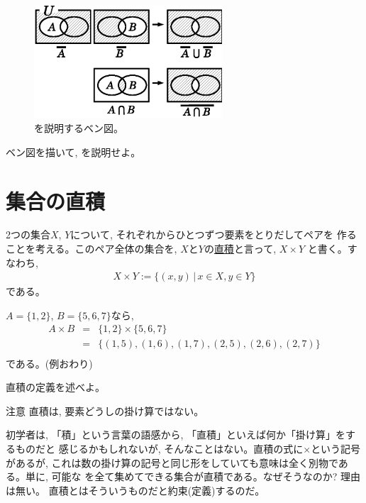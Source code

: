 \begin{figure}[ht]
    \centering
    \includegraphics[width=7cm]{ven2.eps}
    \caption{を説明するベン図。\label{fig:ven2}}
\end{figure}
\mv

\begin{q}\label{q:logic_ben0}
ベン図を描いて, を説明せよ。
\end{q}
\vv


\section{集合の直積}

2つの集合$X$, $Y$について, それぞれからひとつずつ要素をとりだしてペアを
作ることを考える。このペア全体の集合を, 
$X$と$Y$の\underline{直積}と言って, $X \times Y$
と書く。すなわち, 
\begin{eqnarray}
X \times Y:=\{(x, y)\,|\, x\in X, y \in Y\}
\end{eqnarray}
である。
\mv

\begin{exmpl}\label{ex:gprod1}
$A=\{1, 2\}$, $B=\{5, 6, 7\}$なら, 
\begin{eqnarray}
A \times B&=&\{1, 2\}\times\{5, 6, 7\}\nonumber\\
&=&\{(1, 5), (1, 6), (1, 7), (2, 5), (2, 6), (2, 7)\}\nonumber\\
\end{eqnarray}
である。(例おわり)\end{exmpl}
\mv

\begin{q}\label{q:logic_direct_product}
直積の定義を述べよ。
\end{q}
\mv

\begin{itembox}{注意}
直積は, 要素どうしの掛け算ではない。
\end{itembox}
初学者は, 「積」という言葉の語感から, 「直積」といえば何か「掛け算」をするものだと
感じるかもしれないが, そんなことはない。直積の式に$\times$という記号があるが, 
これは数の掛け算の記号と同じ形をしていても意味は全く別物である。単に, 可能な
を全て集めてできる集合が直積である。なぜそうなのか? 理由は無い。
直積とはそういうものだと約束(定義)するのだ。\\

